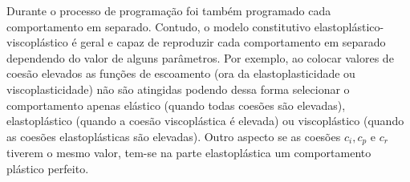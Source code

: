 Durante o processo de programação foi também programado cada comportamento em separado. Contudo, o modelo constitutivo elastoplástico-viscoplástico é geral e capaz de reproduzir cada comportamento em separado dependendo do valor de alguns parâmetros. Por exemplo, ao colocar valores de coesão elevados as funções de escoamento (ora da elastoplasticidade ou viscoplasticidade) não são atingidas podendo dessa forma selecionar o comportamento apenas elástico (quando todas coesões são elevadas), elastoplástico (quando a coesão viscoplástica é elevada) ou viscoplástico (quando as coesões elastoplásticas são elevadas). Outro aspecto se as coesões $c_i, c_p$ e $c_r$ tiverem o mesmo valor, tem-se na parte elastoplástica um comportamento plástico perfeito.


